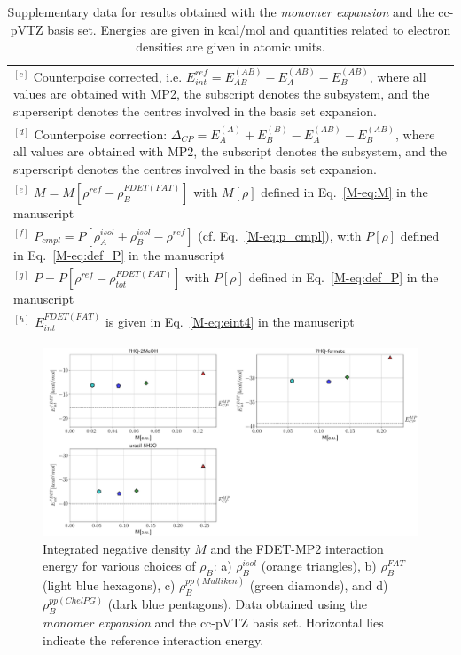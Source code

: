 \documentclass[amsmath,amssymb,preprint,aip,jcp]{revtex4-1}
\begin{document}
\begin{table}[H]
\begin{center}
{\begin{tabular}{|l|l|l|l|l|l|l|l|l|l|}
\multicolumn{10}{p{1.0\textwidth}}{$^{[c]}$ Counterpoise corrected, i.e. $E_{int}^{ref} = E_{AB}^{(AB)} - E_{A}^{(AB)} - E_{B}^{(AB)}$, where all values are obtained with MP2, the subscript denotes the subsystem, and the superscript denotes the centres involved in the basis set expansion.} \\
\multicolumn{10}{p{1.0\textwidth}}{$^{[d]}$ Counterpoise correction: $\Delta_{CP} = E_{A}^{(A)} + E_{B}^{(B)} - E_{A}^{(AB)} - E_{B}^{(AB)}$, where all values are obtained with MP2, the subscript denotes the subsystem, and the superscript denotes the centres involved in the basis set expansion.} \\
\multicolumn{10}{p{1.0\textwidth}}{$^{[e]}$ $M=M[\rho^{ref} - \rho^{FDET(FAT)}_{B}]$ with $M[\rho]$ defined in Eq.~\ref{M-eq:M} in the manuscript}\\
\multicolumn{10}{p{1.0\textwidth}}{$^{[f]}$ $P_{cmpl}=P[\rho_A^{isol}+\rho_B^{isol} - \rho^{ref}]$ (cf. Eq.~\ref{M-eq:p_cmpl}), with $P[\rho]$ defined in Eq.~\ref{M-eq:def_P} in the manuscript}\\
\multicolumn{10}{p{1.0\textwidth}}{$^{[g]}$ $P=P[\rho^{ref} - \rho_{tot}^{FDET(FAT)}]$ with $P[\rho]$ defined in Eq.~\ref{M-eq:def_P} in the manuscript}\\
\multicolumn{10}{p{1.0\textwidth}}{$^{[h]}$ $E^{FDET(FAT)}_{int}$ is given in Eq.~\ref{M-eq:eint4} in the manuscript}\\
\end{tabular}
}
\end{center}
\caption{Supplementary data for results obtained with the \textit{monomer expansion} and the cc-pVTZ basis set. Energies are given in kcal/mol and quantities related to electron densities are given in atomic units.}
\end{table}

\begin{figure}
\centering
\includegraphics[width=1.0\linewidth]{M_vs_MP_ccpVTZ.pdf}
\caption{Integrated negative density $M$ and the FDET-MP2 interaction energy for various choices of $\rho_B$: a) $\rho_B^{isol}$ (orange triangles), b) $\rho_B^{FAT}$ (light blue hexagons), c) $\rho_B^{pp(Mulliken)}$ (green diamonds), and d) $\rho_B^{pp(ChelPG)}$ (dark blue pentagons). Data obtained using the {\it monomer expansion} and the cc-pVTZ basis set. Horizontal lies indicate the reference interaction energy.}
\label{fig:M_vs_MP}
\end{figure}
\end{document}
